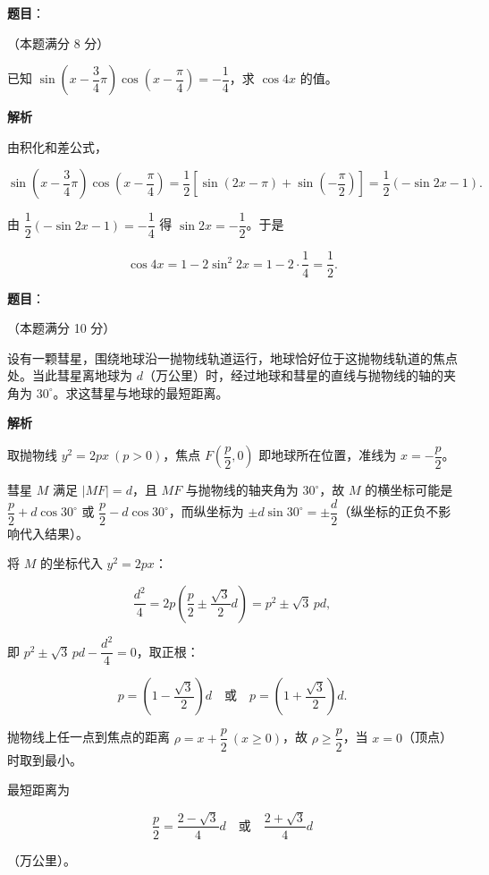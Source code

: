 \begin{answer}

\textbf{题目}：

（本题满分 8 分）

已知 $\sin\left(x-\dfrac{3}{4}\pi\right)\cos\left(x-\dfrac{\pi}{4}\right)=-\dfrac{1}{4}$，求 $\cos 4x$ 的值。

\textbf{解析}

由积化和差公式，

\nopagebreak[4]
\[
\sin\left(x-\frac{3}{4}\pi\right)\cos\left(x-\frac{\pi}{4}\right)
=\frac{1}{2}\left[\sin(2x-\pi)+\sin\left(-\frac{\pi}{2}\right)\right]
=\frac{1}{2}\left(-\sin 2x-1\right).
\]

由 $\dfrac{1}{2}\left(-\sin 2x-1\right)=-\dfrac{1}{4}$ 得 $\sin 2x=-\dfrac{1}{2}$。于是

\nopagebreak[4]
\[
\cos 4x=1-2\sin^{2}2x=1-2\cdot\frac{1}{4}=\frac{1}{2}.
\]


\end{answer}
\begin{answer}

\textbf{题目}：

（本题满分 10 分）

设有一颗彗星，围绕地球沿一抛物线轨道运行，地球恰好位于这抛物线轨道的焦点处。当此彗星离地球为 $d$（万公里）时，经过地球和彗星的直线与抛物线的轴的夹角为 $30^{\circ}$。求这彗星与地球的最短距离。

\textbf{解析}

取抛物线 $y^{2}=2px\ (p>0)$，焦点 $F\left(\dfrac{p}{2},0\right)$ 即地球所在位置，准线为 $x=-\dfrac{p}{2}$。

彗星 $M$ 满足 $|MF|=d$，且 $MF$ 与抛物线的轴夹角为 $30^{\circ}$，故 $M$ 的横坐标可能是 $\dfrac{p}{2}+d\cos 30^{\circ}$ 或 $\dfrac{p}{2}-d\cos 30^{\circ}$，而纵坐标为 $\pm d\sin 30^{\circ}=\pm\dfrac{d}{2}$（纵坐标的正负不影响代入结果）。

将 $M$ 的坐标代入 $y^{2}=2px$：

\nopagebreak[4]
\[
\frac{d^{2}}{4}=2p\left(\frac{p}{2}\pm\frac{\sqrt{3}}{2}d\right)=p^{2}\pm\sqrt{3}\,pd,
\]

即 $p^{2}\pm\sqrt{3}\,pd-\dfrac{d^{2}}{4}=0$，取正根：

\nopagebreak[4]
\[
p=\left(1-\frac{\sqrt{3}}{2}\right)d\quad\text{或}\quad p=\left(1+\frac{\sqrt{3}}{2}\right)d.
\]

抛物线上任一点到焦点的距离 $\rho=x+\dfrac{p}{2}\ \left(x\ge 0\right)$，故 $\rho\ge\dfrac{p}{2}$，当 $x=0$（顶点）时取到最小。

最短距离为

\nopagebreak[4]
\[
\frac{p}{2}=\frac{2-\sqrt{3}}{4}d\quad\text{或}\quad\frac{2+\sqrt{3}}{4}d
\]

（万公里）。


\end{answer}
